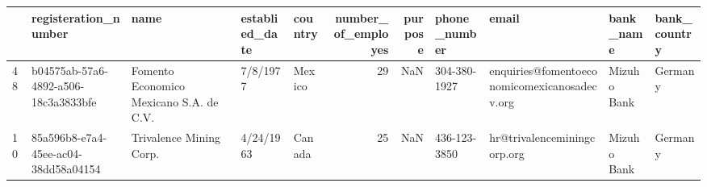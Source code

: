 \begin{tabular}{lllllrrllll}
\toprule
{} &                  registeration\_number &                                     name & establied\_date & country &  number\_of\_employes &  purpose &  phone\_number &                                         email &    bank\_name & bank\_country \\
\midrule
48 &  b04575ab-57a6-4892-a506-18c3a3833bfe &  Fomento Economico Mexicano S.A. de C.V. &       7/8/1977 &  Mexico &                  29 &      NaN &  304-380-1927 &  enquiries@fomentoeconomicomexicanosadecv.org &  Mizuho Bank &      Germany \\
10 &  85a596b8-e7a4-45ee-ac04-38dd58a04154 &                  Trivalence Mining Corp. &      4/24/1963 &  Canada &                  25 &      NaN &  436-123-3850 &                   hr@trivalenceminingcorp.org &  Mizuho Bank &      Germany \\
\bottomrule
\end{tabular}
